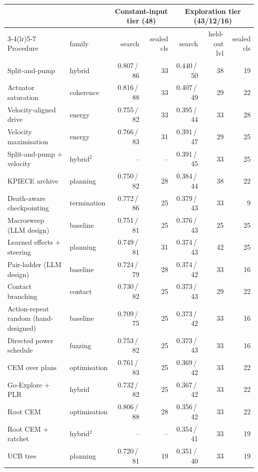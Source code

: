 \begin{table}[t]\centering\small\setlength{\tabcolsep}{4pt}
\begin{tabular}{llrrrrr}\toprule
 & & \multicolumn{2}{c}{Constant-input tier (48)} & \multicolumn{3}{c}{Exploration tier (43/12/16)} \\
\cmidrule(lr){3-4}\cmidrule(lr){5-7}
Procedure & family & search & sealed cls & search & held-out lvl & sealed cls \\ \midrule
Split-and-pump & hybrid & 0.807\,/\,86 & 33 & 0.440\,/\,50 & 38 & 19 \\
Actuator saturation & coherence & 0.816\,/\,88 & 33 & 0.407\,/\,49 & 29 & 22 \\
Velocity-aligned drive & energy & 0.755\,/\,82 & 33 & 0.395\,/\,44 & 33 & 28 \\
Velocity maximisation & energy & 0.766\,/\,83 & 31 & 0.391\,/\,47 & 29 & 25 \\
Split-and-pump + velocity & hybrid$^2$ & -- & -- & 0.391\,/\,45 & 33 & 25 \\
KPIECE archive & planning & 0.750\,/\,82 & 28 & 0.384\,/\,44 & 38 & 22 \\
Death-aware checkpointing & termination & 0.772\,/\,86 & 25 & 0.379\,/\,43 & 33 & 9 \\
Macrosweep (LLM design) & baseline & 0.751\,/\,81 & 25 & 0.376\,/\,43 & 25 & 25 \\
Learned effects + steering & planning & 0.749\,/\,81 & 31 & 0.374\,/\,43 & 42 & 25 \\
Pair-ladder (LLM design) & baseline & 0.724\,/\,79 & 28 & 0.374\,/\,42 & 33 & 16 \\
Contact branching & contact & 0.730\,/\,82 & 25 & 0.373\,/\,43 & 29 & 22 \\
Action-repeat random (hand-designed) & baseline & 0.709\,/\,75 & 25 & 0.373\,/\,42 & 33 & 16 \\
Directed power schedule & fuzzing & 0.753\,/\,82 & 25 & 0.373\,/\,43 & 33 & 16 \\
CEM over plans & optimisation & 0.761\,/\,83 & 25 & 0.369\,/\,42 & 33 & 22 \\
Go-Explore + PLR & hybrid & 0.732\,/\,82 & 25 & 0.367\,/\,42 & 33 & 22 \\
Root CEM & optimisation & 0.806\,/\,88 & 28 & 0.356\,/\,42 & 33 & 22 \\
Root CEM + ratchet & hybrid$^2$ & -- & -- & 0.354\,/\,41 & 33 & 19 \\
UCB tree & planning & 0.720\,/\,81 & 19 & 0.351\,/\,40 & 33 & 19 \\

\end{tabular}
\end{table}
